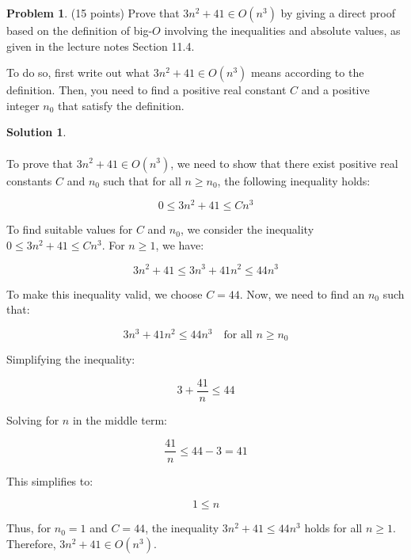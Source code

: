 \documentclass{article}
\theoremstyle{definition}
\newtheorem{problem}{Problem}
\newtheorem*{solution}{Solution}
\begin{document}
\newpage
\begin{problem} (15 points)
Prove that $3n^2+41 \in O(n^3)$ by giving a direct proof based on the definition of 
big-$O$ involving the inequalities and absolute values, as given in the lecture notes 
Section 11.4.  

To do so, first write out what $3n^2+41 \in O(n^3)$ means according to the definition.  
Then, you need to find a positive real constant $C$ and a positive integer $n_0$ 
that satisfy the definition.
\end{problem}
\begin{solution}
  ~\\
  ~\\
  To prove that $3n^2 + 41 \in O(n^3)$, we need to show that there exist positive real constants $C$ and $n_0$ such that for all $n \geq n_0$, the following inequality holds:

\[
0 \leq 3n^2 + 41 \leq Cn^3
\]

To find suitable values for $C$ and $n_0$, we consider the inequality $0 \leq 3n^2 + 41 \leq Cn^3$. For $n \geq 1$, we have:

\[
3n^2 + 41 \leq 3n^3 + 41n^2 \leq 44n^3
\]

To make this inequality valid, we choose $C = 44$. Now, we need to find an $n_0$ such that:

\[
3n^3 + 41n^2 \leq 44n^3 \quad \text{for all } n \geq n_0
\]

Simplifying the inequality:

\[
3 + \frac{41}{n} \leq 44
\]

Solving for $n$ in the middle term:

\[
\frac{41}{n} \leq 44 - 3 = 41
\]

This simplifies to:

\[
1 \leq n
\]

Thus, for $n_0 = 1$ and $C = 44$, the inequality $3n^2 + 41 \leq 44n^3$ holds for all $n \geq 1$. Therefore, $3n^2 + 41 \in O(n^3)$.
\end{solution}
\end{document}
